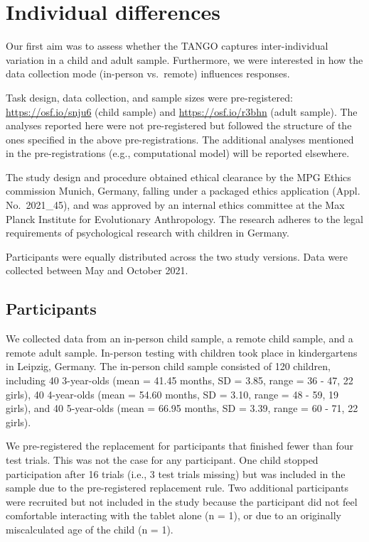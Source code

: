 \documentclass[
  man,floatsintext]{apa6}
\begin{document}
\hypertarget{individual-differences}{%
\section{Individual differences}\label{individual-differences}}

Our first aim was to assess whether the TANGO captures inter-individual variation in a child and adult sample.
Furthermore, we were interested in how the data collection mode (in-person vs.~remote) influences responses.

Task design, data collection, and sample sizes were pre-registered: \url{https://osf.io/snju6} (child sample) and \url{https://osf.io/r3bhn} (adult sample).
The analyses reported here were not pre-registered but followed the structure of the ones specified in the above pre-registrations.
The additional analyses mentioned in the pre-registrations (e.g., computational model) will be reported elsewhere.

The study design and procedure obtained ethical clearance by the MPG Ethics commission Munich, Germany, falling under a packaged ethics application (Appl. No.~2021\_45), and was approved by an internal ethics committee at the Max Planck Institute for Evolutionary Anthropology.
The research adheres to the legal requirements of psychological research with children in Germany.

Participants were equally distributed across the two study versions.
Data were collected between May and October 2021.

\hypertarget{participants}{%
\subsection{Participants}\label{participants}}

We collected data from an in-person child sample, a remote child sample, and a remote adult sample.
In-person testing with children took place in kindergartens in Leipzig, Germany.
The in-person child sample consisted of 120 children, including 40 3-year-olds (mean = 41.45 months, SD = 3.85, range = 36 - 47, 22 girls), 40 4-year-olds (mean = 54.60 months, SD = 3.10, range = 48 - 59, 19 girls), and 40 5-year-olds (mean = 66.95 months, SD = 3.39, range = 60 - 71, 22 girls).

We pre-registered the replacement for participants that finished fewer than four test trials.
This was not the case for any participant.
One child stopped participation after 16 trials (i.e., 3 test trials missing) but was included in the sample due to the pre-registered replacement rule.
Two additional participants were recruited but not included in the study because the participant did not feel comfortable interacting with the tablet alone (n = 1), or due to an originally miscalculated age of the child (n = 1).
\end{document}
